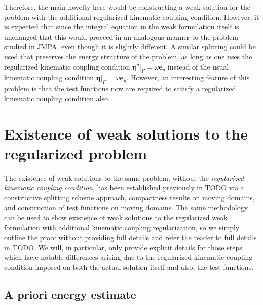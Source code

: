 \documentclass[11pt]{article}
\newcommand{\bd}{\boldsymbol}
\theoremstyle{definition}
\begin{document}
Therefore, the main novelty here would be constructing a weak solution for the problem with the additional regularized kinematic coupling condition. However, it is expected that since the integral equation in the weak formulation itself is unchanged that this would proceed in an analogous manner to the problem studied in JMPA, even though it is slightly different. A similar splitting could be used that preserves the energy structure of the problem, as long as one uses the regularized kinematic coupling condition $\bd{\eta}^{\delta}|_{\Gamma} = \omega \bd{e}_{y}$ instead of the usual kinematic coupling condition $\bd{\eta}|_{\Gamma} = \omega \bd{e}_{y}$. However, an interesting feature of this problem is that the test functions now are required to satisfy a regularized kinematic coupling condition also.

\section{Existence of weak solutions to the regularized problem}

The existence of weak solutions to the same problem, without the \textit{regularized kinematic coupling condition}, has been established previously in TODO via a constructive splitting scheme approach, compactness results on moving domains, and construction of test functions on moving domains. The same methodology can be used to show existence of weak solutions to the regularized weak formulation with additional kinematic coupling regularization, so we simply outline the proof without providing full details and refer the reader to full details in TODO. We will, in particular, only provide explicit details for those steps which have notable differences arising due to the regularized kinematic coupling condition imposed on both the actual solution itself and also, the test functions.

\subsection{A priori energy estimate}
\end{document}
